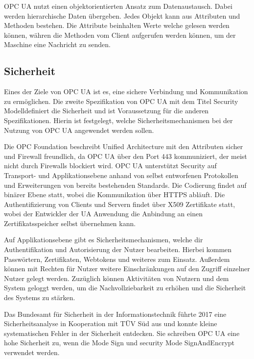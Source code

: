 \documentclass[a4paper, 12pt, oneside, toc=listofnumbered, bibliography=totoc]{scrbook}
\begin{document}
		OPC UA nutzt einen objektorientierten Ansatz zum Datenaustausch. Dabei werden hierarchische Daten übergeben. Jedes Objekt kann aus Attributen und Methoden bestehen. Die Attribute beinhalten Werte welche gelesen werden können, währen die Methoden vom Client aufgerufen werden können, um der Maschine eine Nachricht zu senden. 
		
		\subsection{Sicherheit}
		
		Eines der Ziele von OPC UA ist es, eine sichere Verbindung und Kommunikation zu ermöglichen. Die zweite Spezifikation von OPC UA mit dem Titel \glqq Security Modell\grqq definiert die Sicherheit und ist Voraussetzung für die anderen Spezifikationen. Hierin ist festgelegt, welche Sicherheitsmechanismen bei der Nutzung von OPC UA angewendet werden sollen.
		
		Die OPC Foundation beschreibt Unified Architecture mit den Attributen sicher und Firewall freundlich, da OPC UA über den Port 443 kommuniziert, der meist nicht durch Firewalls blockiert wird. OPC UA unterstützt Security auf Transport- und Applikationsebene anhand von selbst entworfenen Protokollen und Erweiterungen von bereits bestehenden Standards. Die Codierung findet auf binärer Ebene statt, wobei die Kommunikation über HTTPS abläuft. Die Authentifizierung von Clients und Servern findet über X509 Zertifikate statt, wobei der Entwickler der UA Anwendung die Anbindung an einen Zertifikatsspeicher selbst übernehmen kann. \cite{noauthor_unified_nodate, noauthor_opc_nodate}
		
		Auf Applikationsebene gibt es Sicherheitsmechanismen, welche dir Authentifikation und Autorisierung der Nutzer bearbeiten. Hierbei kommen Passwörtern, Zertifikaten, Webtokens und weiteres zum Einsatz. Außerdem können mit Rechten für Nutzer weitere Einschränkungen auf den Zugriff einzelner Nutzer gelegt werden. Zuzüglich können Aktivitäten von Nutzern und dem System geloggt werden, um die Nachvollziebarkeit zu erhöhen und die Sicherheit des Systems zu stärken. \cite{noauthor_unified_nodate, noauthor_opc_nodate}
		
		Das Bundesamt für Sicherheit in der Informationstechnik führte 2017 eine Sicherheitsanalyse in Kooperation mit TÜV Süd aus und konnte kleine systematischen Fehler in der Sicherheit entdecken. Sie schreiben OPC UA eine hohe Sicherheit zu, wenn die  Mode Sign und security Mode SignAndEncrypt verwendet werden. \cite{damm_opc_2017}
		
\end{document}

